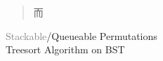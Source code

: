 \begin{frame}{}

  \pause

  \pause
  \begin{quote}
    \centerline{\Large {}而}
  \end{quote}
\end{frame}

\begin{frame}{}
  \begin{center}
    {\LARGE
      \textcolor{gray}{Stackable}/Queueable Permutations \\[0.50cm]
      Treesort Algorithm on BST
    }
  \end{center}
\end{frame}
